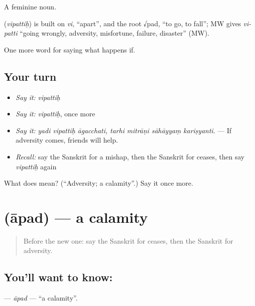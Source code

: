 A feminine noun.

\begin{cousinweb}
\textbf{} (\emph{vipattiḥ}) is built on \emph{vi}, \textquotedblleft{}apart\textquotedblright{}, and the root √pad, \textquotedblleft{}to go, to fall\textquotedblright{}; MW gives \emph{vi-patti} \textquotedblleft{}going wrongly, adversity, misfortune, failure, disaster\textquotedblright{} (MW).
\end{cousinweb}

\begin{grammarlens}[title={What you've built}]
One more word for saying what happens if.
\end{grammarlens}

\subsection*{Your turn}
\begin{itemize}
\raggedright
  \item \emph{Say it:} \emph{vipattiḥ}
  \item \emph{Say it:} \emph{vipattiḥ}, once more
  \item \emph{Say it:} \emph{yadi vipattiḥ āgacchati, tarhi mitrāṇi sāhāyyaṃ kariṣyanti.} — If adversity comes, friends will help.
  \item \emph{Recall:} say the Sanskrit for a mishap, then the Sanskrit for ceases, then say \emph{vipattiḥ} again
\end{itemize}

\begin{tcolorbox}[breakable,colback=teal!4,colframe=teal!35!black,title={Before you move on}]
What does  mean? (\textquotedblleft{}Adversity; a calamity\textquotedblright{}.) Say it once more.
\end{tcolorbox}
\section[\texorpdfstring{\sk{आपद्} (āpad)}{आपद् (āpad)}]{ (āpad) — a calamity}

\label{lesson:SA-C375-apad}



\begin{quote}
Before the new one: say the Sanskrit for ceases, then the Sanskrit for adversity.
\end{quote}

\subsection*{You'll want to know: }
\textbf{} — \emph{āpad} — \textquotedblleft{}a calamity\textquotedblright{}.

